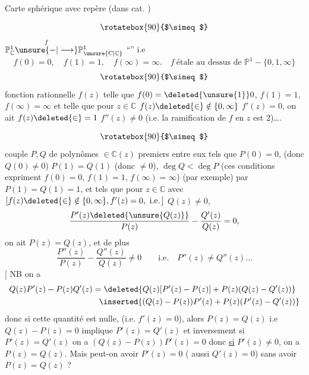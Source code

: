 Carte sphérique  avec repère (dans cat. )

\[
\rotatebox{90}{$\simeq$}
\]
 $\mathbb P^{1}_{\mathbb C}\overset{f}{\unsure{-|\longrightarrow}}\mathbb P^{1}_{\unsure{\mathrm C|\mathbb C}}$ ``'' i.e
\[
 f(0)=0,\quad f(1)=1,\quad f(\infty)=\infty.\quad f\ \text{étale au dessus de }\mathbb P^{1}-\{0,1,\infty\}
\]
\[
\rotatebox{90}{$\simeq$}
\]
fonction rationnelle $f(z)$ telle que $f(0)=\deleted{\unsure{1}}0$, $f(1)=1$, $f(\infty)=\infty$ et telle que pour $z\in\mathbb C$  $f(z)\deleted{\in}\notin\{0,\infty\}$ $f'(z)=0$, on ait $f(z)\deleted{\in}=1$ \unsure{$\}$|,}  $f''(z)\ne0$ (i.e. la ramification de $f$ en $z$ est $2$)\ldots.

\[
\rotatebox{90}{$\simeq$}
\]
couple $P,Q$ \inserted{$[f=P/Q\quad !\,]$} de polynômes $\in\mathbb C(z)$ premiers entre eux  tels que $P(0)=0$, (donc $Q(0)\ne0$) $P(1)=Q(1)$ (donc $\ne0$), $\deg Q<\deg P$ (ces conditions expriment  $f(0)=0$, $f(1)=1$, $f(\infty)=\infty$)
 (par exemple) par $P(1)=Q(1)=1$, et tels que pour $z\in\mathbb C$ avec $[f(z)\deleted{\in}\notin\{0,\infty\}, f'(z)=0,\ \mathrm{i.e.}\,]$  $Q(z)\ne0$,
\[
 \frac{P'(z)\deleted{\unsure{Q(z)}}}{P(z)}-\frac{Q'(z)}{Q(z)}=0,
\]
on ait $P(z)=Q(z)$, et de plus
\[
 \frac{P''(z)}{P(z)}-\frac{Q''(z)}{Q(z)}\ne0\qquad\text{i.e.}\quad P''(z)\ne Q''(z)\ldots
\]
[ NB on a
\[
\begin{aligned}
 Q(z)P'(z)-P(z)Q'(z)&=\deleted{Q(z)[P'(z)-P(z)]+P(z)(Q(z)-Q'(z))}\\
 &\phantom{=}\inserted{(Q(z)-P(z))P'(z)+P(z)(P'(z)-Q'(z))}
\end{aligned}
\]
donc si  cette quantité est nulle, (i.e. $f'(z)=0$), alors $P(z)=Q(z)$  i.e $Q(z)-P(z)=0$ implique $P'(z)=Q'(z)$ et inversement si $P'(z)=Q'(z)$ on a $(Q(z)-P(z))P'(z)=0$ donc \uline{si} $P'(z)\ne0$, on a $P(z)=Q(z)$. Mais peut-on avoir $P'(z)=0$ ( aussi $Q'(z)=0$) \unsure{$\}$|)} sans avoir $P(z)=Q(z)$ ?


